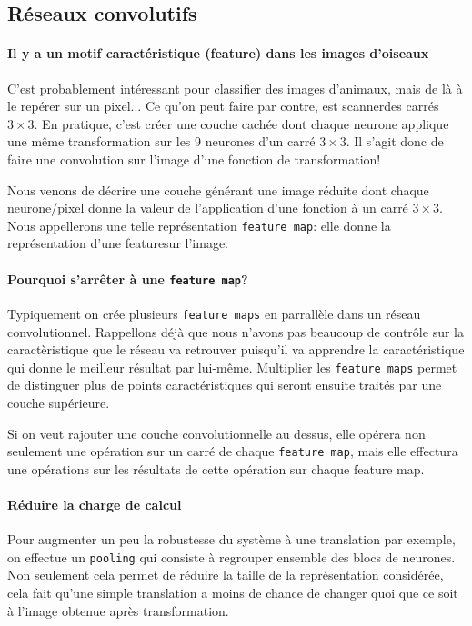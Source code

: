 \documentclass[a4paper, journal, 11pt, onecolumn]{IEEEtran}
\begin{document}
\subsection{Réseaux convolutifs}

\paragraph{Il y a un motif caractéristique (feature) dans les images d'oiseaux}

C'est probablement intéressant pour classifier des images d'animaux, mais de là
à le repérer sur un pixel... Ce qu'on peut faire par contre, est \og
scanner\fg des carrés $3\times 3$. En pratique, c'est créer une couche cachée
dont chaque neurone applique une même transformation sur les 9 neurones d'un
carré $3\times 3$. Il s'agit donc de faire une convolution sur l'image d'une
fonction de transformation!

Nous venons de décrire une couche générant une image réduite dont chaque
neurone/pixel donne la valeur de l'application d'une fonction à un carré
$3\times 3$. Nous appellerons une telle représentation \texttt{feature map}:
elle donne la représentation d'une \og feature\fg sur l'image.

\paragraph{Pourquoi s'arrêter à une \texttt{feature map}?}

Typiquement on crée plusieurs \texttt{feature maps} en parrallèle dans un réseau
convolutionnel. Rappellons déjà que nous n'avons pas beaucoup de contrôle sur la
caractèristique que le réseau va retrouver puisqu'il va apprendre la
caractéristique qui donne le meilleur résultat par lui-même. Multiplier les
\texttt{feature maps} permet de distinguer plus de points caractéristiques qui
seront ensuite traités par une couche supérieure.

Si on veut rajouter une couche convolutionnelle au dessus, elle opérera non
seulement une opération sur un carré de chaque \texttt{feature map}, mais elle
effectura une opérations sur les résultats de cette opération sur chaque feature
map.

\paragraph{Réduire la charge de calcul}

Pour augmenter un peu la robustesse du système à une translation par exemple, on
effectue un \texttt{pooling} qui consiste à regrouper ensemble des blocs de
neurones. Non seulement cela permet de réduire la taille de la représentation
considérée, cela fait qu'une simple translation a moins de chance de changer
quoi que ce soit à l'image obtenue après transformation.
\end{document}
